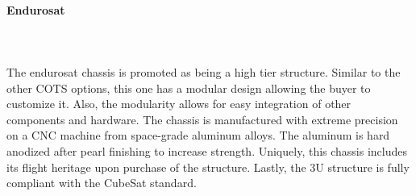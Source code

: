 \paragraph{Endurosat} ~\\~\\
The endurosat chassis is promoted as being a high tier structure. Similar to the other COTS options, this one has a modular design allowing the buyer to customize it. Also, the modularity allows for easy integration of other components and hardware. The chassis is manufactured with extreme precision on a CNC machine from space-grade aluminum alloys. The aluminum is hard anodized after pearl finishing to increase strength. Uniquely, this chassis includes its flight heritage upon purchase of the structure. Lastly, the 3U structure is fully compliant with the CubeSat standard.\cite{enduro_sat} 

